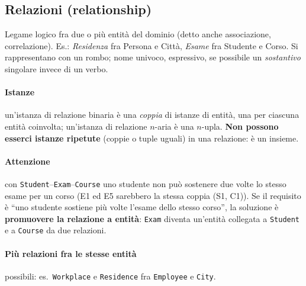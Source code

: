 \documentclass[a4paper,12pt]{article}
\begin{document}
\subsection{Relazioni (relationship)}

Legame logico fra due o più entità del dominio (detto anche associazione,
correlazione). Es.: \emph{Residenza} fra Persona e Città, \emph{Esame} fra
Studente e Corso. Si rappresentano con un rombo; nome univoco, espressivo, se
possibile un \emph{sostantivo} singolare invece di un verbo.
\begin{center}
\end{center}

\paragraph{Istanze} un'istanza di relazione binaria è una \emph{coppia} di
istanze di entità, una per ciascuna entità coinvolta; un'istanza di relazione
$n$-aria è una $n$-upla. \textbf{Non possono esserci istanze ripetute} (coppie
o tuple uguali) in una relazione: è un insieme.

\paragraph{Attenzione} con \texttt{Student}--\texttt{Exam}--\texttt{Course}
uno studente non può sostenere due volte lo stesso esame per un corso (E1 ed E5
sarebbero la stessa coppia (S1, C1)). Se il requisito è ``uno studente sostiene
più volte l'esame dello stesso corso'', la soluzione è \textbf{promuovere la
relazione a entità}: \texttt{Exam} diventa un'entità collegata a
\texttt{Student} e a \texttt{Course} da due relazioni.
\begin{center}
\end{center}

\paragraph{Più relazioni fra le stesse entità} possibili: es.\
\texttt{Workplace} e \texttt{Residence} fra \texttt{Employee} e
\texttt{City}.
\end{document}
